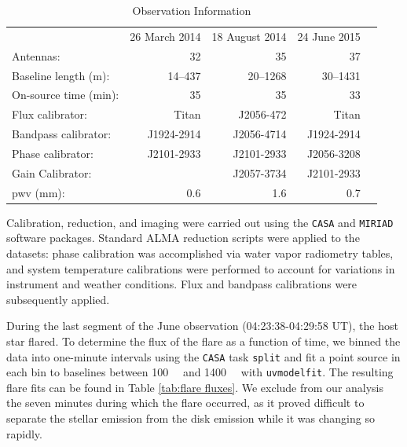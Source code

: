 \documentclass[12pt,oneside]{article}
\begin{document}
\begin{table}	
  \centering
	\caption{Observation Information}
  \label{tab:observations}
  \begin{tabular}{lrrrr}
    \toprule
                    & 26 March 2014 & 18 August 2014 & 24 June 2015 \\
    \cmidrule(lr){2-4}
    Antennas:             & 32         & 35            & 37 \\
    Baseline length (m):  & 14--437    & 20--1268      & 30--1431 \\
    On-source time (min): & 35         & 35            & 33 \\
    Flux calibrator:      & Titan      & J2056-472     & Titan \\
    Bandpass calibrator:  & J1924-2914 & J2056-4714    & J1924-2914 \\
    Phase calibrator:     & J2101-2933 & J2101-2933    & J2056-3208 \\
    Gain Calibrator:      &            & J2057-3734    & J2101-2933 \\
    pwv (\si{mm}):        & 0.6        & 1.6           & 0.7 \\
    \bottomrule
  \end{tabular}
\end{table}

Calibration, reduction, and imaging were carried out using the \texttt{CASA} and \texttt{MIRIAD} software packages. Standard ALMA reduction scripts were applied to the datasets: phase calibration was accomplished via water vapor radiometry tables, and system temperature calibrations were performed to account for variations in instrument and weather conditions. 
Flux and bandpass calibrations were subsequently applied.

During the last segment of the June observation (04:23:38-04:29:58 UT), the host star flared. 
To determine the flux of the flare as a function of time, we binned the data into one-minute intervals using the \texttt{CASA} task \texttt{split} and fit a point source in each bin to baselines between \SI{100}{\kilo \lambda} and \SI{1400}{\kilo \lambda} with \texttt{uvmodelfit}. 
The resulting flare fits can be found in Table \ref{tab:flare fluxes}. 
We exclude from our analysis the seven minutes during which the flare occurred, as it proved difficult to separate the stellar emission from the disk emission while it was changing so rapidly.
\end{document}
